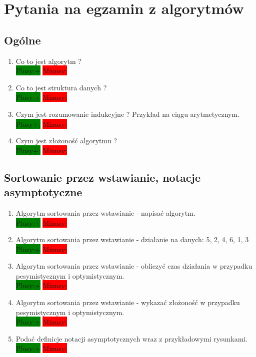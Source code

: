 \documentclass[a4paper,11pt]{article}
\begin{document}
\tableofcontents

\newpage
\section{Pytania na egzamin z algorytmów}
\subsection{Ogólne}
\begin{enumerate}
\item Co to jest algorytm ? \\ \colorbox{green}{Plusy:+} \colorbox{red}{Minusy: }

\item Co to jest struktura danych ? \\ \colorbox{green}{Plusy:+} \colorbox{red}{Minusy: }

\item Czym jest rozumowanie indukcyjne ? Przykład na ciągu arytmetycznym. \\ \colorbox{green}{Plusy+:} \colorbox{red}{
Minusy: }

\item Czym jest złożoność algorytmu ? \\ \colorbox{green}{Plusy+:} \colorbox{red}{Minusy: }

\end{enumerate}
\subsection{Sortowanie przez wstawianie, notacje asymptotyczne}
\begin{enumerate}
\item Algorytm sortowania przez wstawianie - napisać algorytm. \\ \colorbox{green}{Plusy:+} \colorbox{red}{Minusy: }

\item Algorytm sortowania przez wstawianie - działanie na danych: 5, 2, 4, 6, 1, 3 \\ \colorbox{green}{Plusy:+} \colorbox{red}{Minusy: }

\item Algorytm sortowania przez wstawianie - obliczyć czas działania w przypadku pesymistycznym i optymistycznym.\\ \colorbox{green}{Plusy:+} \colorbox{red}{Minusy: }

\item Algorytm sortowania przez wstawianie - wykazać złożoność w przypadku pesymistycznym i optymistycznym. \\ \colorbox{green}{Plusy:+} \colorbox{red}{Minusy: }

\item Podać definicje notacji asymptotycznych wraz z przykładowymi rysunkami.\\ \colorbox{green}{Plusy:+} \colorbox{red}{Minusy: }

\end{enumerate}
\end{document}
